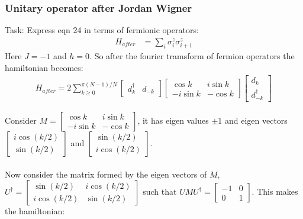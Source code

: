 \documentclass[11pt,a4paper]{article}
\begin{document}
	\subsubsection{Unitary operator after Jordan Wigner}
	
	Task: Express eqn 24 in terms of fermionic operators:
	\begin{align}
	H_{after} &= \sum_{i}\sigma_{i}^z \sigma_{i+1}^z
	\end{align}
	Here $J = -1$ and $h = 0$. So after the fourier tramsform of fermion operators the hamiltonian becomes:
	\begin{align}
	H_{after} = 2 \sum_{k \geq 0}^{\pi(N-1)/N} \begin{bmatrix}
	d_{k}^{\dagger} & d_{-k}
	\end{bmatrix} \begin{bmatrix}
	\cos k&i\sin k\\
	-i\sin k&-\cos k
	\end{bmatrix} \begin{bmatrix}
	d_{k}\\d_{-k}^{\dagger}
	\end{bmatrix}
	\end{align}
	
	Consider $M = \begin{bmatrix}
	\cos k&i\sin k\\
	-i\sin k&-\cos k
	\end{bmatrix}$, it has eigen values $\pm 1$ and eigen vectors $\begin{bmatrix}
	i\cos(k/2)\\ \sin(k/2)
	\end{bmatrix}$ and $\begin{bmatrix}
	\sin(k/2)\\i\cos(k/2)
	\end{bmatrix}$.\\\\
	
	Now consider the  matrix formed by the eigen vectors of $M$, $ U^\dagger = \begin{bmatrix}
	\sin(k/2)&i\cos(k/2)\\
	i\cos(k/2)&\sin(k/2)
	\end{bmatrix}$ such that $ U M U^\dagger  = \begin{bmatrix}
	-1&0\\0&1
	\end{bmatrix}$. This makes the hamiltonian:
	
\end{document}
